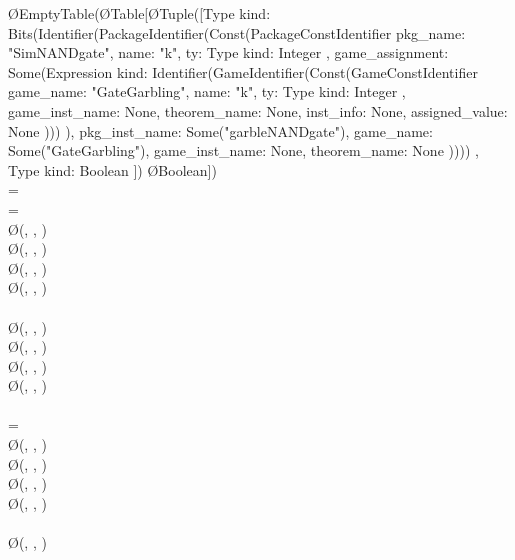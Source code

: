 {  \gets \O{EmptyTable}(\O{Table}[\O{Tuple([Type { kind: Bits(Identifier(PackageIdentifier(Const(PackageConstIdentifier { pkg_name: "SimNANDgate", name: "k", ty: Type { kind: Integer }, game_assignment: Some(Expression { kind: Identifier(GameIdentifier(Const(GameConstIdentifier { game_name: "GateGarbling", name: "k", ty: Type { kind: Integer }, game_inst_name: None, theorem_name: None, inst_info: None, assigned_value: None }))) }), pkg_inst_name: Some("garbleNANDgate"), game_name: Some("GateGarbling"), game_inst_name: None, theorem_name: None })))) }, Type { kind: Boolean }])} \rightarrow \O{Boolean}])\\
\pcif {} =  \pcthen\\
\pcind\pcif {} =  \pcthen\\
\pcind\pcind {}\left[0\right] \gets \O{}(, , )\\
\pcind\pcind {}\left[1\right] \gets \O{}(, , )\\
\pcind\pcind {}\left[2\right] \gets \O{}(, , )\\
\pcind\pcind {}\left[3\right] \gets \O{}(, , )\\
\pcind\pcelse\\
\pcind\pcind {}\left[0\right] \gets \O{}(, , )\\
\pcind\pcind {}\left[1\right] \gets \O{}(, , )\\
\pcind\pcind {}\left[2\right] \gets \O{}(, , )\\
\pcind\pcind {}\left[3\right] \gets \O{}(, , )\\
\pcelse\\
\pcind\pcif {} =  \pcthen\\
\pcind\pcind {}\left[0\right] \gets \O{}(, , )\\
\pcind\pcind {}\left[1\right] \gets \O{}(, , )\\
\pcind\pcind {}\left[2\right] \gets \O{}(, , )\\
\pcind\pcind {}\left[3\right] \gets \O{}(, , )\\
\pcind\pcelse\\
\pcind\pcind {}\left[0\right] \gets \O{}(, , )\\
}
